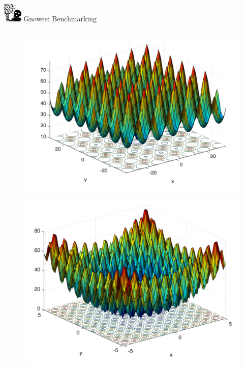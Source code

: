 \documentclass[xcolor=x11names,compress,handout]{beamer}
\renewcommand{\(}{\begin{columns}}
\renewcommand{\)}{\end{columns}}
\newcommand{\<}[1]{\begin{column}{#1}}
\renewcommand{\>}{\end{column}}
\begin{document}
\begin{frame}{\includegraphics[width=0.35in]{../figs/Gnowee.png} Gnowee: Benchmarking \cite{Walton2013a,Yang2014,Civicioglu2013}}
\begin{columns}
    \begin{column}{0.33\linewidth}
      \vspace{-.9cm} 
      \begin{figure}[htp]
        \centering
        \includegraphics[width=1.0\textwidth, height=0.25\textheight]{../figs/Ackley.png} 
        \vspace{-0.35cm}
      \end{figure}        
      \vspace{-1.4cm} 
      \begin{figure}[htp]
        \centering
        \includegraphics[width=1.0\textwidth, height=0.25\textheight]{../figs/Rastrigin.png} 

\end{figure}
\end{column}
\end{columns}
\end{frame}
\end{document}
